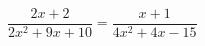 \begin{ex}[type=equation]
	\begin{condition}
		$\dfrac{2x + 2}{2x^2 + 9x + 10} = \dfrac{x + 1}{4x^2 + 4x - 15}$
	\end{condition}
\end{ex}